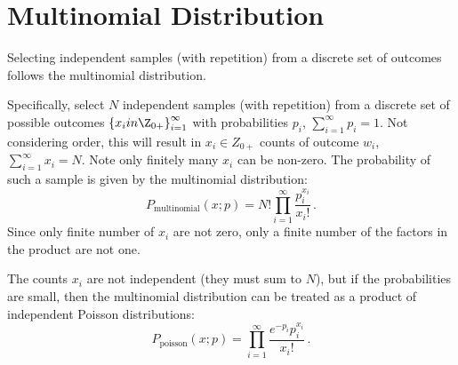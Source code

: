 \section{Multinomial Distribution}
Selecting independent samples (with repetition) from a discrete set of outcomes follows the multinomial distribution.

Specifically, select $N$ independent samples (with repetition) from a discrete set of possible outcomes $\left\{x_i in \Z_{0+}\right\}_{i=1}^{\infty}$ with probabilities $p_i$,  $\sum_{i=1}^{\infty} p_i = 1$.  Not considering order, this will result in $x_i \in Z_{0+}$ counts of outcome $w_i$, $\sum_{i=1}^\infty x_i = N$.  Note only finitely many $x_i$ can be non-zero.
The probability of such a sample is given by the multinomial distribution:
\begin{equation}
\label{eq:multinomial}
P_{\text{multinomial}}(x;p)={N!}\prod_{i=1}^{\infty} \frac{p_i^{x_i}}{x_i!} \,. 
\end{equation}
Since only finite number of $x_i$ are not zero, only a finite number of the factors in the product are not one.

The counts $x_i$ are not independent (they must sum to $N$), but if the probabilities are small, then the multinomial distribution can be treated as a product of independent Poisson distributions:
\begin{equation}
P_{\text{poisson}}(x;p) = \prod_{i=1}^{\infty} \frac{e^{-p_i} p_i^{x_i}}{x_i!} \,.
\end{equation}
